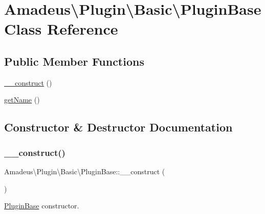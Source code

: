 \hypertarget{classAmadeus_1_1Plugin_1_1Basic_1_1PluginBase}{}\section{Amadeus\textbackslash{}Plugin\textbackslash{}Basic\textbackslash{}Plugin\+Base Class Reference}
\label{classAmadeus_1_1Plugin_1_1Basic_1_1PluginBase}
\subsection*{Public Member Functions}
\begin{DoxyCompactItemize}
\item 
\hyperlink{classAmadeus_1_1Plugin_1_1Basic_1_1PluginBase_a376b1b0f45a30a7f043931fe7b341ea3}{\+\_\+\+\_\+construct} ()
\item 
\hyperlink{classAmadeus_1_1Plugin_1_1Basic_1_1PluginBase_af35a310762f2f18efc46d06a42adb1cc}{get\+Name} ()
\end{DoxyCompactItemize}


\subsection{Constructor \& Destructor Documentation}
\mbox{\label{classAmadeus_1_1Plugin_1_1Basic_1_1PluginBase_a376b1b0f45a30a7f043931fe7b341ea3}} 
\subsubsection{\texorpdfstring{\+\_\+\+\_\+construct()}{\_\_construct()}}
{\footnotesize\ttfamily Amadeus\textbackslash{}\+Plugin\textbackslash{}\+Basic\textbackslash{}\+Plugin\+Base\+::\+\_\+\+\_\+construct (\begin{DoxyParamCaption}{ }\end{DoxyParamCaption})\hspace{0.3cm}{\ttfamily [abstract]}}

\hyperlink{classAmadeus_1_1Plugin_1_1Basic_1_1PluginBase}{Plugin\+Base} constructor. 

